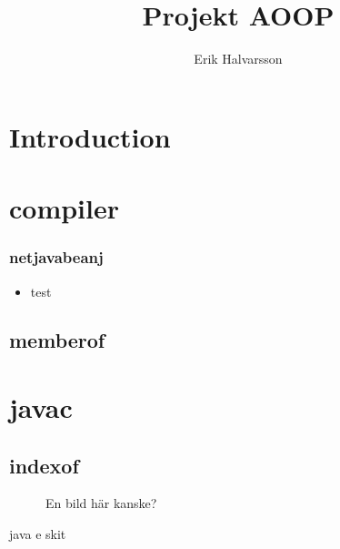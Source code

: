 \documentclass{article}
\begin{document}
\rfoot{}
\lhead{}
\chead{}
\rhead{}
\lfoot{}
\title{Projekt AOOP}
\author{Erik Halvarsson}
\maketitle
\begin{center}
\end{center}
\thispagestyle{empty}
\newpage
\section{Introduction}

\newpage
\tableofcontents
\newpage

\section{compiler}

\subsubsection{netjavabeanj}

\begin{itemize}
\item test \cite{java}
\end{itemize}


\subsection{memberof}

\section{javac}

\subsection{indexof}

\begin{figure}[h]
\centerline{
}
\caption{En bild här kanske? \label{fig:sketch}}
\end{figure}

\begin{thebibliography}{9}
	java e skit
\end{thebibliography}
\end{document}
